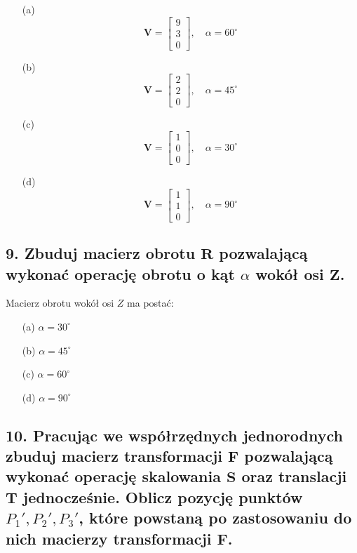 \begin{enumerate}
    \item[(a)] 
    \[
    \mathbf{V} = \begin{bmatrix} 9 \\ 3 \\ 0 \end{bmatrix}, \quad \alpha = 60^\circ
    \]

    \item[(b)] 
    \[
    \mathbf{V} = \begin{bmatrix} 2 \\ 2 \\ 0 \end{bmatrix}, \quad \alpha = 45^\circ
    \]

    \item[(c)] 
    \[
    \mathbf{V} = \begin{bmatrix} 1 \\ 0 \\ 0 \end{bmatrix}, \quad \alpha = 30^\circ
    \]

    \item[(d)] 
    \[
    \mathbf{V} = \begin{bmatrix} 1 \\ 1 \\ 0 \end{bmatrix}, \quad \alpha = 90^\circ
    \]
\end{enumerate}



\subsection*{9. Zbuduj macierz obrotu \( \mathbf{R} \) pozwalającą wykonać operację obrotu o kąt \( \alpha \) wokół osi \( \mathbf{Z} \).}

Macierz obrotu wokół osi \( Z \) ma postać:


\begin{enumerate}
    \item[(a)] \( \alpha = 30^\circ \)
    \item[(b)] \( \alpha = 45^\circ \)
    \item[(c)] \( \alpha = 60^\circ \)
    \item[(d)] \( \alpha = 90^\circ \)
\end{enumerate}







\subsection*{10. Pracując we współrzędnych jednorodnych zbuduj macierz transformacji \( \mathbf{F} \) pozwalającą wykonać operację skalowania \( \mathbf{S} \) oraz translacji \( \mathbf{T} \) jednocześnie. 
Oblicz pozycję punktów \( P_1', P_2', P_3' \), które powstaną po zastosowaniu do nich macierzy transformacji \( \mathbf{F} \).}


